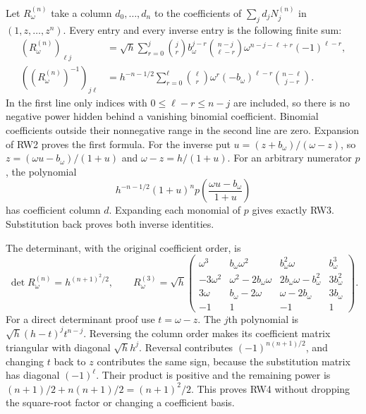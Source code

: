 \documentclass[11pt]{article}
\begin{document}
Let $R_\omega^{(n)}$ take a column $d_0,\ldots,d_n$ to the
coefficients of $\sum_jd_jN_j^{(n)}$ in $(1,z,\ldots,z^n)$.
Every entry and every inverse entry is the following finite sum:
\[
 \begin{aligned}
 (R_\omega^{(n)})_{\ell j}
  &=\sqrt h\sum_{r=0}^j
    \binom jr b_\omega^{j-r}
    \binom{n-j}{\ell-r}\omega^{n-j-\ell+r}(-1)^{\ell-r},\\
 ((R_\omega^{(n)})^{-1})_{j\ell}
  &=h^{-n-1/2}\sum_{r=0}^{\ell}
     \binom\ell r\omega^r(-b_\omega)^{\ell-r}
                         \binom{n-\ell}{j-r}.
 \end{aligned}\tag{RW3}
\]
In the first line only indices with $0\le\ell-r\le n-j$
are included, so there is no negative power hidden behind a
vanishing binomial coefficient. Binomial coefficients outside
their nonnegative range in the second line are zero.
Expansion of RW2 proves the first formula. For the inverse put
$u=(z+b_\omega)/(\omega-z)$, so
$z=(\omega u-b_\omega)/(1+u)$ and
$\omega-z=h/(1+u)$. For an arbitrary numerator $p$, the polynomial
\[
 h^{-n-1/2}(1+u)^n
                   p\left(\frac{\omega u-b_\omega}{1+u}\right)
\]
has coefficient column $d$. Expanding each monomial of $p$
gives exactly RW3. Substitution back proves both inverse identities.

The determinant, with the original coefficient order, is
\[
 \det R_\omega^{(n)}=h^{(n+1)^2/2},\qquad
 R_\omega^{(3)}=\sqrt h
 \begin{pmatrix}
 \omega^3&b_\omega\omega^2&b_\omega^2\omega&b_\omega^3\\
 -3\omega^2&\omega^2-2b_\omega\omega&2b_\omega\omega-b_\omega^2&3b_\omega^2\\
 3\omega&b_\omega-2\omega&\omega-2b_\omega&3b_\omega\\
 -1&1&-1&1
 \end{pmatrix}.
 \tag{RW4}
\]
For a direct determinant proof use $t=\omega-z$. The $j$th
polynomial is $\sqrt h(h-t)^jt^{n-j}$. Reversing the column
order makes its coefficient matrix triangular with diagonal
$\sqrt h h^j$. Reversal contributes
$(-1)^{n(n+1)/2}$, and changing $t$ back to $z$ contributes the
same sign, because the substitution matrix has diagonal $(-1)^\ell$.
Their product is positive and the remaining power is
$(n+1)/2+n(n+1)/2=(n+1)^2/2$. This proves RW4 without dropping
the square-root factor or changing a coefficient basis.
\end{document}
